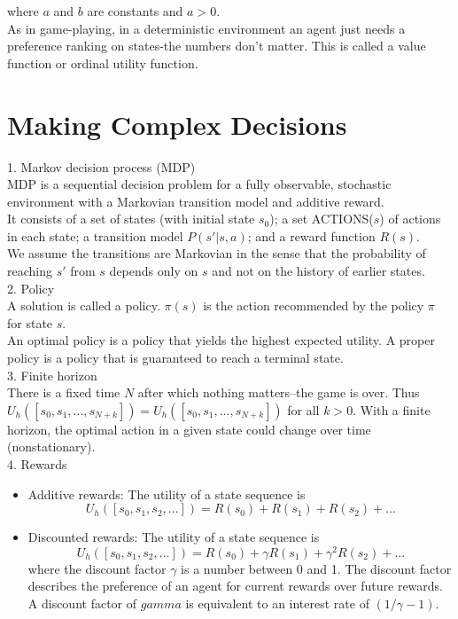 \documentclass[12pt]{article}
\begin{document}
where $a$ and $b$ are constants and $a>0$. \\

As in game-playing, in a deterministic environment an agent just needs a preference ranking on states-the numbers don't matter. This is called a value function or ordinal utility function.

\section*{Making Complex Decisions}

1. Markov decision process (MDP) \\

MDP is a sequential decision problem for a fully observable, stochastic environment with a Markovian transition model and additive reward. \\

It consists of a set of states (with initial state $s_0$); a set ACTIONS($s$) of actions in each state; a transition model $P(s'| s, a)$; and a reward function $R(s)$. \\

We assume the transitions are Markovian in the sense that the probability of reaching $s'$ from $s$ depends only on $s$ and not on the history of earlier states. \\

2. Policy \\

A solution is called a policy. $\pi(s)$ is the action recommended by the policy $\pi$ for state $s$. \\

An optimal policy is a policy that yields the highest expected utility. A proper policy is a policy that is guaranteed to reach a terminal state. \\

3. Finite horizon \\

There is a fixed time $N$ after which nothing matters--the game is over. Thus $U_h([s_0, s_1,...,s_{N+k}]) = U_h([s_0, s_1,...,s_{N+k}])$ for all $k>0$.  With a finite horizon, the optimal action in a given state could change over time (nonstationary). \\

4. Rewards
\begin{itemize}
\item Additive rewards: The utility of a state sequence is
  \begin{equation*}
    U_h([s_0,s_1,s_2,...]) = R(s_0)+R(s_1)+R(s_2)+...
  \end{equation*}
\item Discounted rewards: The utility of a state sequence is
  \begin{equation*}
    U_h([s_0,s_1,s_2,...])
    = R(s_0) + \gamma R(s_1) + \gamma^2 R(s_2)+...
  \end{equation*}
  where the discount factor $\gamma$ is a number between 0 and 1. The discount factor describes the preference of an agent for current rewards over future rewards. A discount factor of $gamma$ is equivalent to an interest rate of $(1 / \gamma -1)$.
\end{itemize}
\end{document}
